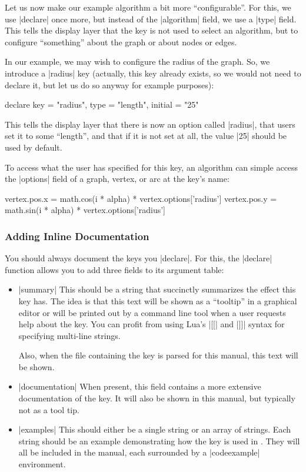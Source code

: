 Let us now make our example algorithm a bit more ``configurable''. For
this, we use |declare| once more, but instead of the |algorithm|
field, we use a |type| field. This tells the display layer that the
key is not used to select an algorithm, but to configure ``something''
about the graph or about nodes or edges.

In our example, we may wish to configure the radius of the graph. So,
we introduce a |radius| key (actually, this key already exists, so we
would not need to declare it, but let us do so anyway for example
purposes):

\begin{codeexample}
declare {
  key = "radius",
  type = "length",
  initial = "25"
}
\end{codeexample}

This tells the display layer that there is now an option called
|radius|, that users set it to some ``length'', and that if it is not
set at all, the value |25| should be used by default.

To access what the user has specified for this key, an algorithm can
simple access the |options| field of a graph, vertex, or arc at the
key's name:

\begin{codeexample}
          vertex.pos.x = math.cos(i * alpha) * vertex.options['radius']
          vertex.pos.y = math.sin(i * alpha) * vertex.options['radius']
\end{codeexample}



\subsubsection{Adding Inline Documentation}

You should always document the keys you |declare|. For this, the
|declare| function allows you to add three fields to its argument
table:
\begin{itemize}
\item |summary| This should be a string that succinctly summarizes the
  effect this key has. The idea is that this text will be shown as a
  ``tooltip'' in a graphical editor or will be printed out by a
  command line tool when a user requests help about the key.
  You can profit from using Lua's |[[| and |]]| syntax for specifying
  multi-line strings.
  
  Also, when the file containing the key is parsed for
  this manual, this text will be shown.
\item |documentation| When present, this field contains a more
  extensive documentation of the key. It will also be shown in this
  manual, but typically not as a tool tip.
\item |examples| This should either be a single string or an array of
  strings. Each string should be an example demonstrating how the key
  is used in \tikzname. They will all be included in the manual, each
  surrounded by a |codeexample| environment.
\end{itemize}

